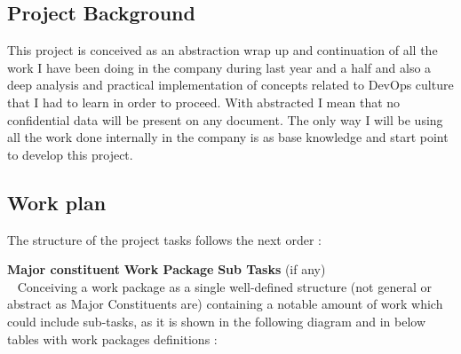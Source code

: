 \documentclass{article}
\begin{document}
\subsection{Project Background}

This project is conceived as an abstraction wrap up and continuation of all the work I have been doing in the company during last year and a half and also a deep analysis and practical implementation of concepts related to DevOps culture that I had to learn in order to proceed. With abstracted I mean that no confidential data will be present on any document. The only way I will be using all the work done internally in the company is as base knowledge and start point to develop this project.
\newpage
\subsection{Work plan}
The structure of the project tasks follows the next order :

\medskip
\textbf{Major constituent} \textrightarrow \textbf{Work Package} \textrightarrow \textbf{Sub Tasks} (if any)
\medskip\\~
Conceiving a work package as a single well-defined structure (not general or abstract as Major Constituents are) containing a notable amount of work which could include sub-tasks, as it is shown in the following diagram and in below tables with work packages definitions : 
\end{document}
